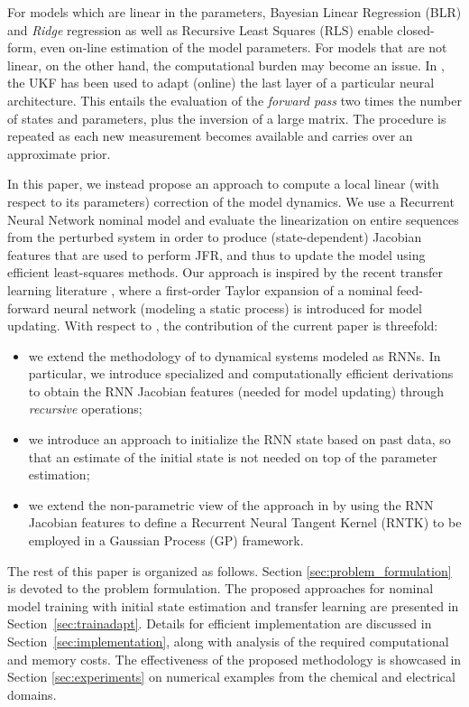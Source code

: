 \documentclass{article}
\begin{document}
For models which are linear in the parameters, Bayesian Linear Regression (BLR) and \emph{Ridge} regression \cite{hastie01statisticallearning} as well as Recursive Least Squares (RLS) \cite{Ljung} enable  closed-form, even on-line estimation of the model parameters. For models that are not linear, on the other hand, the computational burden may become an issue. In \cite{pozzoli2020tustin}, the UKF has been used to adapt (online) the last layer of a particular neural architecture. This  entails the evaluation of the \emph{forward pass} two times the number of states and parameters, plus the inversion of a large matrix. The procedure is repeated as each new measurement becomes available and carries over an approximate prior. 

In this paper, we instead propose an approach to compute a local linear (with respect to its parameters) correction of the model dynamics. We use a Recurrent Neural Network nominal model and evaluate the linearization on entire sequences from the perturbed system in order to produce (state-dependent) Jacobian features that are used to perform JFR, and thus to update the model  using efficient least-squares methods. 
Our approach is inspired by the recent transfer learning literature  \cite{maddox2021fast}, where a first-order Taylor expansion of a nominal feed-forward neural network (modeling a static process) is introduced for model updating. With respect to \cite{maddox2021fast}, the contribution of the current paper is threefold:
\begin{itemize}
    \item we extend the methodology of \cite{maddox2021fast} to dynamical systems modeled as RNNs. In particular, we introduce {specialized} and computationally efficient derivations to obtain the RNN Jacobian features (needed for model updating) through \emph{recursive}  operations;  
    \item we introduce an approach to initialize the RNN state based on past data, so that an estimate of the initial state is not needed on top of the parameter estimation;  
    \item we extend the non-parametric view of the approach in \cite{maddox2021fast} by using the RNN Jacobian features to define a Recurrent Neural Tangent Kernel (RNTK) to be employed in a Gaussian Process (GP) framework. 
    \end{itemize}    
    

The rest of this paper is organized as follows. Section \ref{sec:problem_formulation} is devoted to the problem formulation. The proposed approaches for nominal model training with initial state estimation  and 
transfer learning  are presented in Section~\ref{sec:trainadapt}. Details for efficient implementation are discussed in Section~\ref{sec:implementation}, along with analysis of  the required computational and memory costs. The effectiveness of the proposed methodology is showcased in Section \ref{sec:experiments} on numerical examples from the chemical and electrical domains.
\end{document}

